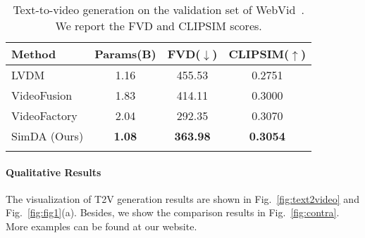 \begin{table}[]\small
\centering
\caption{Text-to-video generation on the validation set of WebVid~\cite{webvid}. We report the FVD and CLIPSIM scores.}
\vspace{-0.2cm}
\begin{tabular}{@{}lccc@{}}
\toprule
\bf Method    &\bf Params(B)   & \bf FVD($\downarrow$)    & \bf CLIPSIM($\uparrow$) \\ \midrule
LVDM~\cite{lvdm}      &1.16   & 455.53 & 0.2751  \\
VideoFusion~\cite{videofusion} &1.83  & 414.11 & 0.3000  \\
\color{dt}VideoFactory~\cite{videofactory} &2.04   & \color{dt}292.35 & \color{dt}0.3070  \\ \midrule
SimDA (Ours)      &\bf 1.08   & \bf 363.98       & \bf 0.3054        \\ \bottomrule
\label{Tab:webvid}
\vspace{-0.3cm}
\end{tabular}
\end{table}

\paragraph{Qualitative Results} The visualization of T2V generation results are shown in Fig.~\ref{fig:text2video} and  Fig.~\ref{fig:fig1}(a). Besides, we show the comparison results in  Fig.~\ref{fig:contra}.
More examples can be found at our website.

